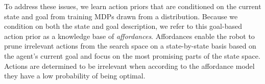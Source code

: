 To address these issues, we learn action
priors that are conditioned on the current state and goal
from training MDPs drawn from a distribution. Because we
condition on both the state and goal description, we refer to this
goal-based action prior as a knowledge base of {\em affordances}.
Affordances enable the robot to prune irrelevant actions from the 
search space on a
state-by-state basis based on the agent's current goal and focus on
the most promising parts of the state space. Actions are determined
to be irrelevant when according to the affordance model they
have a low probability of being optimal.






